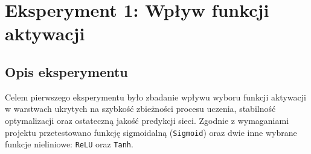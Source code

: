 \documentclass[11pt,a4paper]{article}
\begin{document}
\section{Eksperyment 1: Wpływ funkcji aktywacji}
\label{sec:exp_activations}

\subsection{Opis eksperymentu}
Celem pierwszego eksperymentu było zbadanie wpływu wyboru funkcji aktywacji w warstwach ukrytych na szybkość zbieżności procesu uczenia, stabilność optymalizacji oraz ostateczną jakość predykcji sieci. Zgodnie z wymaganiami projektu przetestowano funkcję sigmoidalną (\texttt{Sigmoid}) oraz dwie inne wybrane funkcje nieliniowe: \texttt{ReLU} oraz \texttt{Tanh}.
\end{document}
